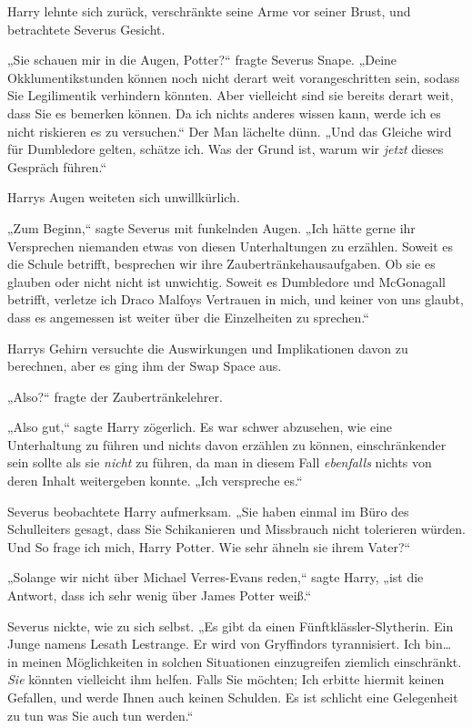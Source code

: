 {Harry lehnte sich zurück, verschränkte seine Arme vor seiner Brust, und betrachtete Severus Gesicht.

„Sie schauen mir in die Augen, Potter?“ fragte Severus Snape. „Deine Okklumentikstunden können noch nicht derart weit vorangeschritten sein, sodass Sie Legilimentik verhindern könnten. Aber vielleicht sind sie bereits derart weit, dass Sie es bemerken können. Da ich nichts anderes wissen kann, werde ich es nicht riskieren es zu versuchen.“ Der Man lächelte dünn. „Und das Gleiche wird für Dumbledore gelten, schätze ich. Was der Grund ist, warum wir \emph{jetzt} dieses Gespräch führen.“

Harrys Augen weiteten sich unwillkürlich.

„Zum Beginn,“ sagte Severus mit funkelnden Augen. „Ich hätte gerne ihr Versprechen niemanden etwas von diesen Unterhaltungen zu erzählen. Soweit es die Schule betrifft, besprechen wir ihre Zaubertränkehausaufgaben. Ob sie es glauben oder nicht nicht ist unwichtig. Soweit es Dumbledore und McGonagall betrifft, verletze ich Draco Malfoys Vertrauen in mich, und keiner von uns glaubt, dass es angemessen ist weiter über die Einzelheiten zu sprechen.“

Harrys Gehirn versuchte die Auswirkungen und Implikationen davon zu berechnen, aber es ging ihm der Swap Space aus.

„Also?“ fragte der Zaubertränkelehrer.

„Also gut,“ sagte Harry zögerlich. Es war schwer abzusehen, wie eine Unterhaltung zu führen und nichts davon erzählen zu können, einschränkender sein sollte als sie \emph{nicht} zu führen, da man in diesem Fall \emph{ebenfalls} nichts von deren Inhalt weitergeben konnte. „Ich verspreche es.“

Severus beobachtete Harry aufmerksam. „Sie haben einmal im Büro des Schulleiters gesagt, dass Sie Schikanieren und Missbrauch nicht tolerieren würden. Und So frage ich mich, Harry Potter. Wie sehr ähneln sie ihrem Vater?“

„Solange wir nicht über Michael Verres-Evans reden,“ sagte Harry, „ist die Antwort, dass ich sehr wenig über James Potter weiß.“

Severus nickte, wie zu sich selbst. „Es gibt da einen Fünftklässler-Slytherin. Ein Junge namens Lesath Lestrange. Er wird von Gryffindors tyrannisiert. Ich bin… in meinen Möglichkeiten in solchen Situationen einzugreifen ziemlich einschränkt. \emph{Sie} könnten vielleicht ihm helfen. Falls Sie möchten; Ich erbitte hiermit keinen Gefallen, und werde Ihnen auch keinen Schulden. Es ist schlicht eine Gelegenheit zu tun was Sie auch tun werden.“

}
